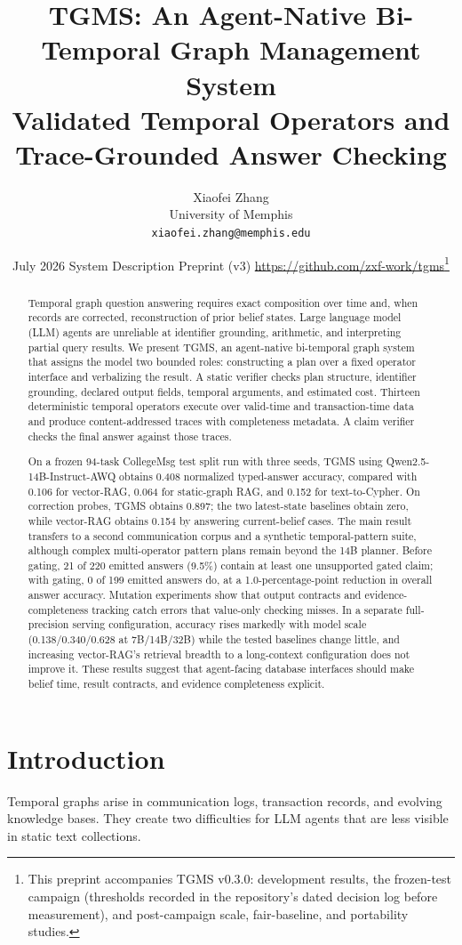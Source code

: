\documentclass[11pt]{article}
\title{TGMS: An Agent-Native Bi-Temporal Graph Management System\\
\large Validated Temporal Operators and Trace-Grounded Answer Checking}
\author{Xiaofei Zhang\\University of Memphis\\\texttt{xiaofei.zhang@memphis.edu}}
\date{July 2026 \;\textperiodcentered\; System Description Preprint (v3)
\;\textperiodcentered\; \url{https://github.com/zxf-work/tgms}\thanks{This
preprint accompanies TGMS v0.3.0: development results, the frozen-test
campaign (thresholds recorded in the repository's dated decision log
before measurement), and post-campaign scale, fair-baseline, and
portability studies.}}
\begin{document}
\maketitle

\begin{abstract}
Temporal graph question answering requires exact composition over time
and, when records are corrected, reconstruction of prior belief states.
Large language model (LLM) agents are unreliable at identifier
grounding, arithmetic, and interpreting partial query results. We
present TGMS, an agent-native bi-temporal graph system that assigns the
model two bounded roles: constructing a plan over a fixed operator
interface and verbalizing the result. A static verifier checks plan
structure, identifier grounding, declared output fields, temporal
arguments, and estimated cost. Thirteen deterministic temporal
operators execute over valid-time and transaction-time data and produce
content-addressed traces with completeness metadata. A claim verifier
checks the final answer against those traces.

On a frozen 94-task CollegeMsg test split run with three seeds, TGMS
using Qwen2.5-14B-Instruct-AWQ obtains 0.408 normalized typed-answer
accuracy, compared with 0.106 for vector-RAG, 0.064 for static-graph
RAG, and 0.152 for text-to-Cypher. On correction probes, TGMS obtains
0.897; the two latest-state baselines obtain zero, while vector-RAG
obtains 0.154 by answering current-belief cases. The main result
transfers to a second communication corpus and a synthetic
temporal-pattern suite, although complex multi-operator pattern plans
remain beyond the 14B planner. Before gating, 21 of 220 emitted
answers (9.5\%) contain at least one unsupported gated claim;
with gating, 0 of 199 emitted answers do, at a 1.0-percentage-point
reduction in overall answer accuracy. Mutation experiments show that
output contracts and evidence-completeness tracking catch errors that
value-only checking misses. In a separate full-precision serving
configuration, accuracy rises markedly with model scale
(0.138/0.340/0.628 at 7B/14B/32B) while the tested baselines change
little, and increasing vector-RAG's retrieval breadth to a long-context
configuration does not improve it. These results suggest that
agent-facing database interfaces should make belief time, result
contracts, and evidence completeness explicit.
\end{abstract}

\section{Introduction}
Temporal graphs arise in communication logs, transaction records, and
evolving knowledge bases. They create two difficulties for LLM agents
that are less visible in static text collections.
\end{document}
